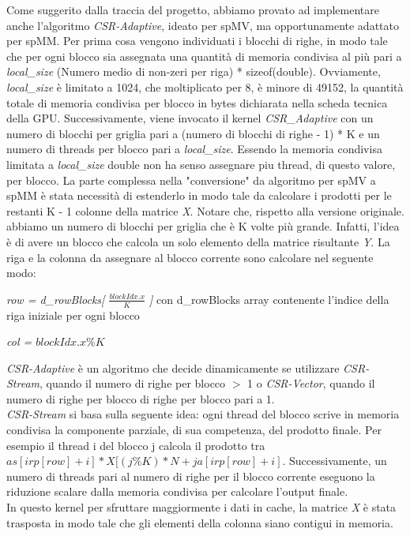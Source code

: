 \documentclass{article}
\begin{document}
Come suggerito dalla traccia del progetto, abbiamo provato ad implementare anche l'algoritmo \textit{CSR-Adaptive}, ideato per spMV, ma opportunamente adattato per spMM. Per prima cosa vengono individuati i blocchi di righe, in modo tale che per ogni blocco sia assegnata una quantità di memoria condivisa al più pari a \textit{local\_size} (Numero medio di non-zeri per riga) * sizeof(double). Ovviamente, \textit{local\_size} è limitato a 1024, che moltiplicato per 8, è minore di 49152, la quantità totale di memoria condivisa per blocco in bytes dichiarata nella scheda tecnica della GPU. Successivamente, viene invocato il kernel \textit{CSR\_Adaptive} con un numero di blocchi per griglia pari a (numero di blocchi di righe - 1) * K e un numero di threads per blocco pari a \textit{local\_size}. Essendo la memoria condivisa limitata a \textit{local\_size} double non ha senso assegnare piu thread, di questo valore, per blocco. La parte complessa nella "conversione" da algoritmo per spMV a spMM è stata necessità di estenderlo in modo tale da calcolare i prodotti per le restanti K - 1 colonne della matrice \textit{X}. Notare che, rispetto alla versione originale. abbiamo un numero di blocchi per griglia che è K volte più grande. Infatti, l'idea è di avere un blocco che calcola un solo elemento della matrice risultante \textit{Y}. La riga e la colonna da assegnare al blocco corrente sono calcolare nel seguente modo:
    \begin{center}
    \item \textit{row = d\_rowBlocks[ $\frac{blockIdx.x} {K}$ ]} con
    d\_rowBlocks array contenente l'indice della riga iniziale per ogni blocco  
    \item \textit{col = $blockIdx.x \% K$}
    \end{center}

\textit{CSR-Adaptive} è un algoritmo che decide dinamicamente se utilizzare \textit{CSR-Stream}, quando il numero di righe per blocco $>$ 1 o \textit{CSR-Vector}, quando il numero di righe per blocco di righe per blocco pari a 1. \\
\textit{CSR-Stream} si basa sulla seguente idea: ogni thread del blocco scrive in memoria condivisa la componente parziale, di sua competenza, del prodotto finale. Per esempio il thread i del blocco j calcola il prodotto tra $as[irp[row] + i] * X[(j \% K ) * N + ja[irp[row]+ i]$. Successivamente, un numero di threads pari al numero di righe per il blocco corrente eseguono la riduzione scalare dalla memoria condivisa per calcolare l'output finale. 
\\ In questo kernel per sfruttare maggiormente i dati in cache, la matrice \textit{X} è stata trasposta in modo tale che gli elementi della colonna siano contigui in memoria.\\
\end{document}

